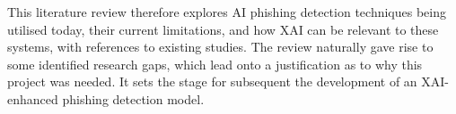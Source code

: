 \noindent This literature review therefore explores AI phishing detection techniques being utilised today, their current limitations, and how XAI can be relevant to these systems, with references to existing studies. The review naturally gave rise to some identified research gaps, which lead onto a justification as to why this project was needed. It sets the stage for subsequent the development of an XAI-enhanced phishing detection model.

